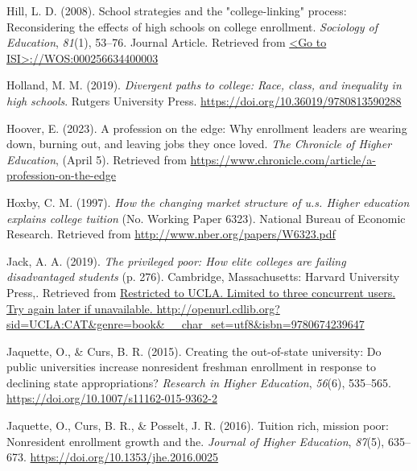 \documentclass[
  12pt,
]{article}
\newlength{\cslhangindent}
\newlength{\cslentryspacingunit} %
\newenvironment{CSLReferences}[2] %
 {%
  \setlength{\parindent}{0pt}
  \ifodd #1
  \let\oldpar\par
  \def\par{\hangindent=\cslhangindent\oldpar}
  \fi
  \setlength{\parskip}{#2\cslentryspacingunit}
 }%
 {}
\begin{document}
\begin{CSLReferences}{1}{0}
\leavevmode{}%
Hill, L. D. (2008). School strategies and the "college-linking" process: Reconsidering the effects of high schools on college enrollment. \emph{Sociology of Education}, \emph{81}(1), 53--76. Journal Article. Retrieved from \href{\%3CGo\%20to\%20ISI\%3E://WOS:000256634400003}{\textless Go to ISI\textgreater://WOS:000256634400003}

\leavevmode{}%
Holland, M. M. (2019). \emph{Divergent paths to college: Race, class, and inequality in high schools}. Rutgers University Press. \url{https://doi.org/10.36019/9780813590288}

\leavevmode{}%
Hoover, E. (2023). A profession on the edge: Why enrollment leaders are wearing down, burning out, and leaving jobs they once loved. \emph{The Chronicle of Higher Education}, (April 5). Retrieved from \url{https://www.chronicle.com/article/a-profession-on-the-edge}

\leavevmode{}%
Hoxby, C. M. (1997). \emph{How the changing market structure of u.s. Higher education explains college tuition} (No. Working Paper 6323). National Bureau of Economic Research. Retrieved from \url{http://www.nber.org/papers/W6323.pdf}

\leavevmode{}%
Jack, A. A. (2019). \emph{The privileged poor: How elite colleges are failing disadvantaged students} (p. 276). Cambridge, Massachusetts: Harvard University Press,. Retrieved from \href{Restricted\%20to\%20UCLA.\%20Limited\%20to\%20three\%20concurrent\%20users.\%20Try\%20again\%20later\%20if\%20unavailable.\%20http://openurl.cdlib.org?sid=UCLA:CAT\&genre=book\&__char_set=utf8\&isbn=9780674239647}{Restricted to UCLA. Limited to three concurrent users. Try again later if unavailable. http://openurl.cdlib.org?sid=UCLA:CAT\&genre=book\&\_\_char\_set=utf8\&isbn=9780674239647}

\leavevmode{}%
Jaquette, O., \& Curs, B. R. (2015). Creating the out-of-state university: Do public universities increase nonresident freshman enrollment in response to declining state appropriations? \emph{Research in Higher Education}, \emph{56}(6), 535--565. \url{https://doi.org/10.1007/s11162-015-9362-2}

\leavevmode{}%
Jaquette, O., Curs, B. R., \& Posselt, J. R. (2016). Tuition rich, mission poor: Nonresident enrollment growth and the. \emph{Journal of Higher Education}, \emph{87}(5), 635--673. \url{https://doi.org/10.1353/jhe.2016.0025}


\end{CSLReferences}
\end{document}
